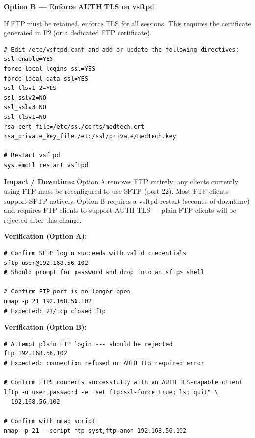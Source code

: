 \documentclass[12pt]{article}
\begin{document}
\bigskip
\noindent\textbf{Option B --- Enforce AUTH TLS on vsftpd}
 
If FTP must be retained, enforce TLS for all sessions. This requires the
certificate generated in F2 (or a dedicated FTP certificate).
 
\begin{lstlisting}[style=terminal]
# Edit /etc/vsftpd.conf and add or update the following directives:
ssl_enable=YES
force_local_logins_ssl=YES
force_local_data_ssl=YES
ssl_tlsv1_2=YES
ssl_sslv2=NO
ssl_sslv3=NO
ssl_tlsv1=NO
rsa_cert_file=/etc/ssl/certs/medtech.crt
rsa_private_key_file=/etc/ssl/private/medtech.key
 
# Restart vsftpd
systemctl restart vsftpd
\end{lstlisting}
\newpage
\begin{impactbox}
\textbf{Impact / Downtime:} Option A removes FTP entirely; any clients
currently using FTP must be reconfigured to use SFTP (port 22). Most FTP
clients support SFTP natively. Option B requires a vsftpd restart (seconds of
downtime) and requires FTP clients to support AUTH TLS --- plain FTP clients
will be rejected after this change.
\end{impactbox}
 
\bigskip
 
\begin{verifybox}
\textbf{Verification (Option A):}
\begin{lstlisting}[style=terminal]
# Confirm SFTP login succeeds with valid credentials
sftp user@192.168.56.102
# Should prompt for password and drop into an sftp> shell
 
# Confirm FTP port is no longer open
nmap -p 21 192.168.56.102
# Expected: 21/tcp closed ftp
\end{lstlisting}
 
\textbf{Verification (Option B):}
\begin{lstlisting}[style=terminal]
# Attempt plain FTP login --- should be rejected
ftp 192.168.56.102
# Expected: connection refused or AUTH TLS required error
 
# Confirm FTPS connects successfully with an AUTH TLS-capable client
lftp -u user,password -e "set ftp:ssl-force true; ls; quit" \
  192.168.56.102
 
# Confirm with nmap script
nmap -p 21 --script ftp-syst,ftp-anon 192.168.56.102
\end{lstlisting}
\end{verifybox}
 
\end{document}
